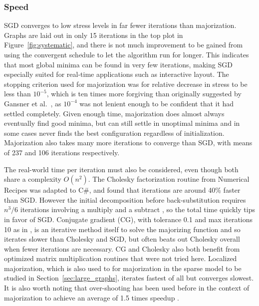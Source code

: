 \subsubsection{Speed}
SGD converges to low stress levels in far fewer iterations than majorization. Graphs are laid out in only 15 iterations in the top plot in Figure~\ref{fig:systematic}, and there is not much improvement to be gained from using the convergent schedule to let the algorithm run for longer. This indicates that most global minima can be found in very few iterations, making SGD especially suited for real-time applications such as interactive layout.
The stopping criterion used for majorization was for relative decrease in stress to be less than $10^{-5}$, which is ten times more forgiving than originally suggested by Gansner et al.\ \cite{Gansner2004}, as $10^{-4}$ was not lenient enough to be confident that it had settled completely. Given enough time, majorization does almost always eventually find good minima, but can still settle in unoptimal minima and in some cases never finds the best configuration regardless of initialization.
Majorization also takes many more iterations to converge than SGD, with means of 237 and 106 iterations respectively.

The real-world time per iteration must also be considered, even though both share a complexity $O(n^2)$. The Cholesky factorization routine from Numerical Recipes \cite{Press2007Cholesky} was adapted to C\#, and found that iterations are around 40\% faster than SGD. However the initial decomposition before back-substitution requires $n^3/6$ iterations involving a multiply and a subtract \cite{Press2007Cholesky}, so the total time quickly tips in favor of SGD.
Conjugate gradient (CG), with tolerance 0.1 and max iterations 10 as in \cite{Gansner2013}, is an iterative method itself to solve the majorizing function and so iterates slower than Cholesky and SGD, but often beats out Cholesky overall when fewer iterations are necessary.
CG and Cholesky also both benefit from optimized matrix multiplication routines \cite{Gansner2004} that were not tried here.
Localized majorization, which is also used to for majorization in the sparse model to be studied in Section~\ref{sec:large_graphs}, iterates fastest of all but converges slowest.
It is also worth noting that over-shooting has been used before in the context of majorization to achieve an average of 1.5 times speedup \cite{Wang2012}.

